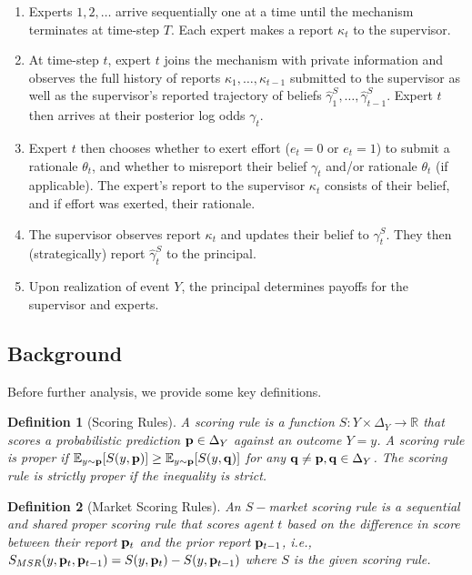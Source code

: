 \documentclass{winnower}
\newtheorem{definition}{Definition}
\begin{document}
\begin{enumerate}
\item Experts $1, 2, \ldots$ arrive sequentially one at a time until the mechanism terminates at time-step $T$. Each expert makes a report $\kappa_t$ to the supervisor.
\item At time-step $t$, expert $t$ joins the mechanism with private information and observes the full history of reports $\kappa_1, \ldots, \kappa_{t-1}$ submitted to the supervisor as well as the supervisor's reported trajectory of beliefs $\hat{\gamma}_1^{S}, \ldots, \hat{\gamma}_{t-1}^{S}$. Expert $t$ then arrives at their posterior log odds $\gamma_t$.
\item Expert $t$ then chooses whether to exert effort ($e_t=0$ or $e_t=1$) to submit a rationale $\theta_t$, and whether to misreport their belief $\gamma_t$ and/or rationale $\theta_t$ (if applicable). The expert's report to the supervisor $\kappa_t$ consists of their belief, and if effort was exerted, their rationale.
\item The supervisor observes report $\kappa_t$ and updates their belief to $\gamma_t^{S}$. They then (strategically) report $\hat{\gamma}_t^{S}$ to the principal.
\item Upon realization of event $Y$, the principal determines payoffs for the supervisor and experts.
\end{enumerate}

\subsection{Background}

Before further analysis, we provide some key definitions. 
\begin{definition}[Scoring Rules]
A scoring rule is a function $S: Y \times \Delta_Y \rightarrow \mathbb{R}$ that scores a probabilistic prediction ${\bf p} \in \Delta_Y$ against an outcome $Y=y$. A scoring rule is \textit{proper} if $\mathbb{E}_{y \sim {\bf p}}[S(y, {\bf p})] \geq \mathbb{E}_{y \sim {\bf p}}[S(y, {\bf q})]$ for any ${\bf q} \neq {\bf p}, {\bf q} \in \Delta_Y$. The scoring rule is \textit{strictly proper} if the inequality is strict.
\end{definition}

\begin{definition}[Market Scoring Rules]
    An $S-$market scoring rule is a sequential and shared proper scoring rule that scores agent $t$ based on the difference in score between their report ${\bf p}_t$ and the prior report ${\bf p}_{t-1}$, i.e., $S_{MSR}(y, {\bf p}_t, {\bf p}_{t-1}) = S(y, {\bf p}_t) - S(y, {\bf p}_{t-1}) $ where $S$ is the given scoring rule. 
\end{definition}
\end{document}
